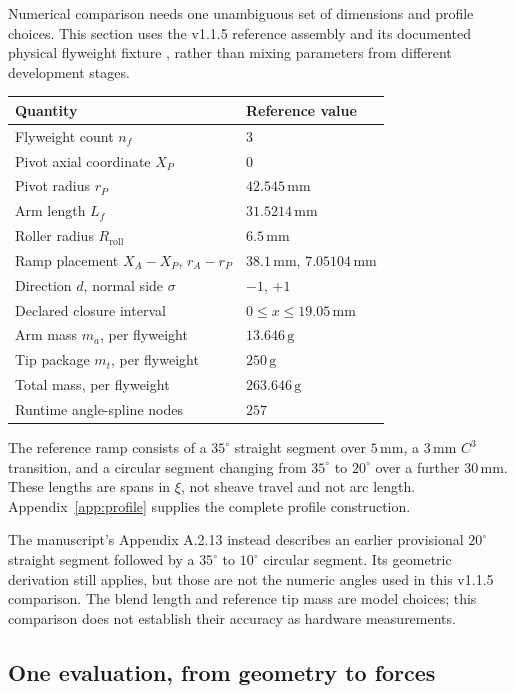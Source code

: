\documentclass[11pt,letterpaper]{article}
\numberwithin{equation}{section}
\begin{document}
Numerical comparison needs one unambiguous set of dimensions and profile choices. This section uses the v1.1.5 reference assembly and its documented physical flyweight fixture \cite{fixture}, rather than mixing parameters from different development stages.

\begin{center}
\begin{tabular}{@{}ll@{}}
\toprule
Quantity & Reference value\\
\midrule
Flyweight count $n_f$ & $3$\\
Pivot axial coordinate $X_P$ & $0$\\
Pivot radius $r_P$ & $42.545\,\mathrm{mm}$\\
Arm length $L_f$ & $31.5214\,\mathrm{mm}$\\
Roller radius $R_{\mathrm{roll}}$ & $6.5\,\mathrm{mm}$\\
Ramp placement $X_A-X_P$, $r_A-r_P$ & $38.1\,\mathrm{mm}$, $7.05104\,\mathrm{mm}$\\
Direction $d$, normal side $\sigma$ & $-1$, $+1$\\
Declared closure interval & $0\le x\le19.05\,\mathrm{mm}$\\
Arm mass $m_a$, per flyweight & $13.646\,\mathrm{g}$\\
Tip package $m_t$, per flyweight & $250\,\mathrm{g}$\\
Total mass, per flyweight & $263.646\,\mathrm{g}$\\
Runtime angle-spline nodes & $257$\\
\bottomrule
\end{tabular}
\end{center}

The reference ramp consists of a $35^\circ$ straight segment over $5\,\mathrm{mm}$, a $3\,\mathrm{mm}$ $C^3$ transition, and a circular segment changing from $35^\circ$ to $20^\circ$ over a further $30\,\mathrm{mm}$. These lengths are spans in $\xi$, not sheave travel and not arc length. Appendix~\ref{app:profile} supplies the complete profile construction.

The manuscript's Appendix A.2.13 instead describes an earlier provisional $20^\circ$ straight segment followed by a $35^\circ$ to $10^\circ$ circular segment. Its geometric derivation still applies, but those are not the numeric angles used in this v1.1.5 comparison. The blend length and reference tip mass are model choices; this comparison does not establish their accuracy as hardware measurements.

\subsection{One evaluation, from geometry to forces}
\end{document}

